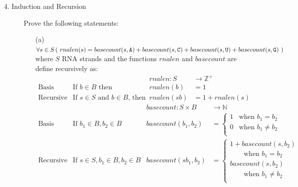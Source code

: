 \begin{description}
  
  \item[4. Induction and Recursion] 
  
  Prove the following statements:
  
  \begin{enumerate}
  
  \item[(a)] $\forall s \in S \, (~rnalen(s) = basecount(s,\texttt{A}) + basecount(s,\texttt{C}) + basecount(s,\texttt{U}) + basecount(s,\texttt{G})~)$ where $S$ RNA strands and the functions $rnalen$ and $basecount$ are define recursively as: 
  \hspace{-1in}
  \[
  \begin{array}{llll}
  & & \textit{rnalen} : S & \to \mathbb{Z}^+ \\
  \textrm{Basis Step:} & \textrm{If } b \in B\textrm{ then } & \textit{rnalen}(b) & = 1 \\
  \textrm{Recursive Step:} & \textrm{If } s \in S\textrm{ and }b \in B\textrm{, then  } & \textit{rnalen}(sb) & = 1 + \textit{rnalen}(s)
  \end{array}
  \]
  \[
  \begin{array}{llll}
  & & \textit{basecount} : S \times B & \to \mathbb{N} \\
  \textrm{Basis Step:} &  \textrm{If } b_1 \in B, b_2 \in B & \textit{basecount}(b_1, b_2) & =
          \begin{cases}
              1 & \textrm{when } b_1 = b_2 \\
              0 & \textrm{when } b_1 \neq b_2 \\
          \end{cases} \\
  \textrm{Recursive Step:} & \textrm{If } s \in S, b_1 \in B, b_2 \in B &\textit{basecount}(s b_1, b_2) & =
          \begin{cases}
              1 + \textit{basecount}(s, b_2) & \\
              \qquad \textrm{when } b_1 = b_2 &\\
              \textit{basecount}(s, b_2) & \\
              \qquad \textrm{when } b_1 \neq b_2 &\\
          \end{cases}
  \end{array}
  \]
  
  \ifsolution
\end{enumerate}
\end{description}
